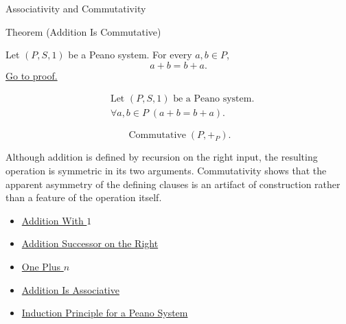 \begin{topicbox}{Associativity and Commutativity}
\begin{theorembox}{Theorem (Addition Is Commutative)}
\begin{theorem}
\label{thm:addition-commutative}
Let $(P,S,1)$ be a Peano system. For every $a,b \in P$,
\[
a+b=b+a.
\]
\hyperref[prf:addition-commutative]{Go to proof.}
\end{theorem}
\end{theorembox}

\begin{remark*}
\[
\begin{aligned}
&\text{Let } (P,S,1) \text{ be a Peano system.}\\
&\forall a,b \in P\;(a+b=b+a).
\end{aligned}
\]
\end{remark*}

\begin{remark*}
\[
\operatorname{Commutative}(P,+_P).
\]
\end{remark*}

\begin{remark*}[Interpretation]
Although addition is defined by recursion on the right input, the resulting
operation is symmetric in its two arguments. Commutativity shows that the
apparent asymmetry of the defining clauses is an artifact of construction
rather than a feature of the operation itself.
\end{remark*}

\begin{dependencies}
\begin{itemize}
  \item \hyperref[thm:addition-with-one]{Addition With $1$}
  \item \hyperref[thm:addition-successor-on-right]{Addition Successor on the Right}
  \item \hyperref[thm:one-plus-n]{One Plus $n$}
  \item \hyperref[thm:addition-associative]{Addition Is Associative}
  \item \hyperref[thm:induction-principle-for-peano-system]{Induction Principle for a Peano System}
\end{itemize}
\end{dependencies}
\end{topicbox}

